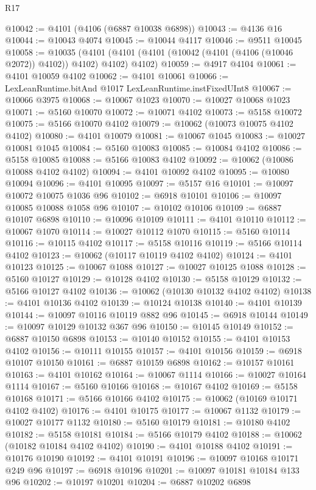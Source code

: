 \begin{lexlean}{R17}
\begin{coremodule}
@10042 := @4101 (@4106 (@6887 @10038 @6898))
@10043 := @4136 @16
@10044 := @10043 @4074
@10045 := @10044 @4117
@10046 := @9511 @10045
@10058 := @10035
    (@4101 (@4101 (@4101 (@10042 (@4101 (@4106 (@10046 @2072)) @4102)) @4102) @4102) @4102)
@10059 := @4917 @4104
@10061 := @4101 @10059 @4102
@10062 := @4101 @10061
@10066 := LexLeanRuntime.bitAnd @1017 LexLeanRuntime.instFixedUInt8
@10067 := @10066 @3975
@10068 := @10067 @1023
@10070 := @10027 @10068 @1023
@10071 := @5160 @10070
@10072 := @10071 @4102
@10073 := @5158 @10072
@10075 := @5166 @10070 @4102
@10079 := @10062 (@10073 @10075 @4102 @4102)
@10080 := @4101 @10079
@10081 := @10067 @1045
@10083 := @10027 @10081 @1045
@10084 := @5160 @10083
@10085 := @10084 @4102
@10086 := @5158 @10085
@10088 := @5166 @10083 @4102
@10092 := @10062 (@10086 @10088 @4102 @4102)
@10094 := @4101 @10092 @4102
@10095 := @10080 @10094
@10096 := @4101 @10095
@10097 := @5157 @16
@10101 := @10097 @10072 @10075 @1036 @96
@10102 := @6918 @10101
@10106 := @10097 @10085 @10088 @1058 @96
@10107 := @10102 @10106
@10109 := @6887 @10107 @6898
@10110 := @10096 @10109
@10111 := @4101 @10110
@10112 := @10067 @1070
@10114 := @10027 @10112 @1070
@10115 := @5160 @10114
@10116 := @10115 @4102
@10117 := @5158 @10116
@10119 := @5166 @10114 @4102
@10123 := @10062 (@10117 @10119 @4102 @4102)
@10124 := @4101 @10123
@10125 := @10067 @1088
@10127 := @10027 @10125 @1088
@10128 := @5160 @10127
@10129 := @10128 @4102
@10130 := @5158 @10129
@10132 := @5166 @10127 @4102
@10136 := @10062 (@10130 @10132 @4102 @4102)
@10138 := @4101 @10136 @4102
@10139 := @10124 @10138
@10140 := @4101 @10139
@10144 := @10097 @10116 @10119 @882 @96
@10145 := @6918 @10144
@10149 := @10097 @10129 @10132 @367 @96
@10150 := @10145 @10149
@10152 := @6887 @10150 @6898
@10153 := @10140 @10152
@10155 := @4101 @10153 @4102
@10156 := @10111 @10155
@10157 := @4101 @10156
@10159 := @6918 @10107 @10150
@10161 := @6887 @10159 @6898
@10162 := @10157 @10161
@10163 := @4101 @10162
@10164 := @10067 @1114
@10166 := @10027 @10164 @1114
@10167 := @5160 @10166
@10168 := @10167 @4102
@10169 := @5158 @10168
@10171 := @5166 @10166 @4102
@10175 := @10062 (@10169 @10171 @4102 @4102)
@10176 := @4101 @10175
@10177 := @10067 @1132
@10179 := @10027 @10177 @1132
@10180 := @5160 @10179
@10181 := @10180 @4102
@10182 := @5158 @10181
@10184 := @5166 @10179 @4102
@10188 := @10062 (@10182 @10184 @4102 @4102)
@10190 := @4101 @10188 @4102
@10191 := @10176 @10190
@10192 := @4101 @10191
@10196 := @10097 @10168 @10171 @249 @96
@10197 := @6918 @10196
@10201 := @10097 @10181 @10184 @133 @96
@10202 := @10197 @10201
@10204 := @6887 @10202 @6898

\end{coremodule}
\end{lexlean}

